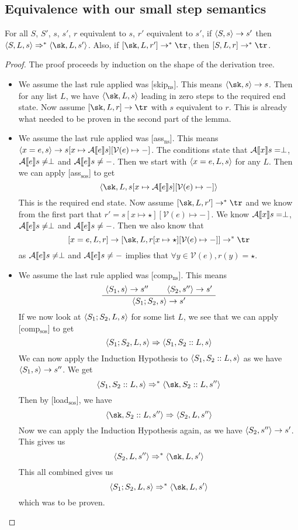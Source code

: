 \subsection{Equivalence with our small step semantics}

\begin{lemma}
\label{nsimpsos}
For all $S$, $S'$, $s$, $s'$, $r$ equivalent to $s$, $r'$ equivalent to $s'$, if $\langle S, s \rangle \to s'$ then $\sos{S}{L}{s} \Rightarrow ^{*} \sos{\sk}{L}{s'}$. Also, if $\cc{\sk}{L}{r'} \to ^{*} \tr$, then $\cc{S}{L}{r} \to ^{*} \tr$.
\end{lemma}
\begin{proof}
The proof proceeds by induction on the shape of the derivation tree. 
\begin{itemize}[noitemsep]
    \item We assume the last rule applied was [skip$_{\textrm{ns}}$]. This means $\ns{\sk}{s}{s}$. Then for any list $L$, we have $\sos{\sk}{L}{s}$ leading in zero steps to the required end state. Now assume $\cc{\sk}{L}{r} \to \tr$ with $s$ equivalent to $r$. This is already what needed to be proven in the second part of the lemma. 
    \item We assume the last rule applied was [ass$_{\textrm{ns}}$]. This means $\langle x=e, s \rangle \to s[x\mapsto\mathcal{A} \llbracket e \rrbracket s][\mathcal{V}(e)\mapsto -]$. The conditions state that $\mathcal{A} \llbracket x \rrbracket s = \perp$, $\mathcal{A} \llbracket e \rrbracket s \neq \perp$ and $\mathcal{A} \llbracket e \rrbracket s \neq -$. Then we start with $\langle x=e, L, s \rangle$ for any $L$. Then we can apply [ass$_{\textrm{sos}}$] to get 
    $$\sos{\sk}{L}{s[x\mapsto\letterfunc{A}{e}s][\mathcal{V}(e)\mapsto -]}$$ 
    This is the required end state. 
    Now assume $\cc{\sk}{L}{r'} \to ^{*} \tr$ and we know from the first part that $r' = s[x\mapsto\star][\mathcal{V}(e)\mapsto -]$. We know $\mathcal{A} \llbracket x \rrbracket s = \perp$, $\mathcal{A} \llbracket e \rrbracket s \neq \perp$ and $\mathcal{A} \llbracket e \rrbracket s \neq -$. 
    Then we also know that 
    $$\cc{x=e}{L}{r} \to \cc{\sk}{L}{r[x\mapsto \star ][\mathcal{V}(e)\mapsto -]} \to ^{*} \tr$$
    as $\mathcal{A} \llbracket e \rrbracket s \neq \perp$ and $\mathcal{A} \llbracket e \rrbracket s \neq -$ implies that $\forall y \in \mathcal{V}(e), r(y) = \star $.
%    
    \item We assume the last rule applied was [comp$_{\textrm{ns}}$]. This means
    $$\centering \AxiomC{$\ns{S_1}{s}{s''}$}
\AxiomC{$\ns{S_2}{s''}{s'}$}
\BinaryInfC{$\ns{S_1; S_2}{s}{s'}$}
\DisplayProof$$
    If we now look at $\langle S_1;S_2, L, s \rangle$ for some list $L$, we see that we can apply [comp$_{\textrm{sos}}$] to get 
    $$\langle S_1;S_2, L, s \rangle \Rightarrow \langle S_1, S_2::L, s \rangle$$
    We can now apply the Induction Hypothesis to $\langle S_1, S_2::L, s \rangle$ as we have $\langle S_1, s \rangle \to s''$. We get 
    $$\sos{S_1}{S_2::L}{s} \Rightarrow ^{*} \sos{\sk}{S_2::L}{s''} $$
    Then by [load$_{\textrm{sos}}$], we have 
    $$\sos{\sk}{S_2::L}{s''} \Rightarrow \sos{S_2}{L}{s''}$$
    Now we can apply the Induction Hypothesis again, as we have $\langle S_2, s'' \rangle \to s'$. This gives us
    $$\sos{S_2}{L}{s''} \Rightarrow ^{*} \sos{\sk}{L}{s'}$$
    This all combined gives us
    $$\sos{S_1;S_2}{L}{s} \Rightarrow ^{*} \sos{\sk}{L}{s'}$$
    which was to be proven.
    

\end{itemize}
\end{proof}
